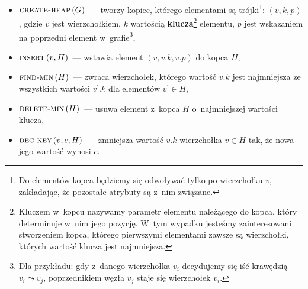 \begin{itemize}
	\item $\textsc{create-heap} \left( G \right)$~--- tworzy kopiec, którego elementami są trójki\footnote{
		Do elementów kopca będziemy się odwoływać tylko po wierzchołku $v$, zakładając, że pozostałe atrybuty są z~nim związane.
	}: $\left( v, k, p \right)$, gdzie $v$ jest wierzchołkiem, $k$ wartością \textbf{klucza}\footnote{
		Kluczem w~kopcu nazywamy parametr elementu należącego do kopca, który determinuje w~nim jego pozycję.
		W~tym wypadku jesteśmy zainteresowani stworzeniem kopca, którego pierwszymi elementami zawsze są wierzchołki, których wartość klucza jest najmniejsza.
	} elementu, $p$ jest wskazaniem na poprzedni element w~grafie\footnote{
		Dla przykładu: gdy z~danego wierzchołka $v_{i}$ decydujemy się iść krawędzią $v_{i} \leadsto v_{j}$, poprzednikiem węzła $v_{j}$ staje się wierzchołek $v_{i}$.
	},
	\item $\textsc{insert} \left( v, H \right)$~--- wstawia element $\left( v, v.k, v.p \right)$ do kopca $H$,
	\item $\textsc{find-min} \left( H \right)$~--- zwraca wierzchołek, którego wartość $v.k$ jest najmniejsza ze wszystkich wartości $v^{\prime}.k$ dla elementów $v^{\prime} \in H$,
	\item $\textsc{delete-min} \left( H \right)$~--- usuwa element z~kopca $H$ o~najmniejszej wartości klucza,
	\item $\textsc{dec-key} \left( v, c, H \right)$~--- zmniejsza wartość $v.k$ wierzchołka $v \in H$ tak, że nowa jego wartość wynosi $c$.
\end{itemize}

